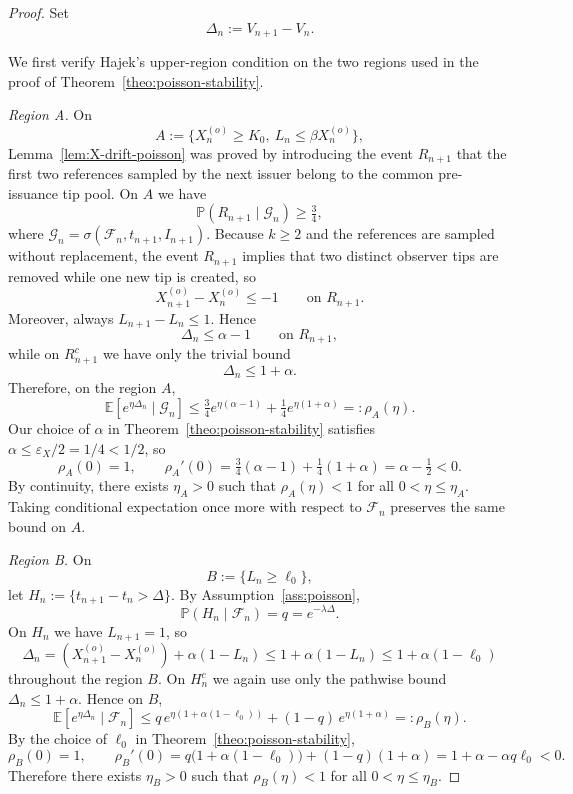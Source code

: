 \documentclass[a4paper,12pt,oneside,reqno]{amsart}
\renewcommand{\P}{{\mathbb P}}
\newcommand{\E}{{\mathbb E}}
\newcommand{\F}{{\mathcal F}}
\newcommand{\1}{{\mathbf 1}}
\begin{document}
\begin{proof}
Set
\[
   \Delta_n:=V_{n+1}-V_n.
\]

We first verify Hajek's upper-region condition on the two regions used in the proof of Theorem~\ref{theo:poisson-stability}.

\smallskip
\noindent\emph{Region A.} On
\[
   A:=\{X_n^{(o)}\ge K_0,\ L_n\le \beta X_n^{(o)}\},
\]
Lemma~\ref{lem:X-drift-poisson} was proved by introducing the event $R_{n+1}$ that the first two references sampled by the next issuer belong to the common pre-issuance tip pool. On $A$ we have
\[
   \P(R_{n+1}\mid \mathcal{G}_n)\ge \tfrac34,
\]
where $\mathcal{G}_n=\sigma(\F_n,t_{n+1},I_{n+1})$. Because $k\ge 2$ and the references are sampled without replacement, the event $R_{n+1}$ implies that two distinct observer tips are removed while one new tip is created, so
\[
   X_{n+1}^{(o)}-X_n^{(o)}\le -1
   \qquad\text{on }R_{n+1}.
\]
Moreover, always $L_{n+1}-L_n\le 1$. Hence
\[
   \Delta_n\le \alpha-1
   \qquad\text{on }R_{n+1},
\]
while on $R_{n+1}^{c}$ we have only the trivial bound
\[
   \Delta_n\le 1+\alpha.
\]
Therefore, on the region $A$,
\[
   \E[e^{\eta\Delta_n}\mid \mathcal{G}_n]
   \le \tfrac34 e^{\eta(\alpha-1)}+\tfrac14 e^{\eta(1+\alpha)}
   =:\rho_A(\eta).
\]
Our choice of $\alpha$ in Theorem~\ref{theo:poisson-stability} satisfies $\alpha\le \varepsilon_X/2=1/4<1/2$, so
\[
   \rho_A(0)=1,
   \qquad
   \rho_A'(0)=\tfrac34(\alpha-1)+\tfrac14(1+\alpha)=\alpha-\tfrac12<0.
\]
By continuity, there exists $\eta_A>0$ such that $\rho_A(\eta)<1$ for all $0<\eta\le \eta_A$. Taking conditional expectation once more with respect to $\F_n$ preserves the same bound on $A$.

\smallskip
\noindent\emph{Region B.} On
\[
   B:=\{L_n\ge \ell_0\},
\]
let $H_n:=\{t_{n+1}-t_n>\Delta\}$. By Assumption~\ref{ass:poisson},
\[
   \P(H_n\mid \F_n)=q=e^{-\lambda\Delta}.
\]
On $H_n$ we have $L_{n+1}=1$, so
\[
   \Delta_n
   =
   (X_{n+1}^{(o)}-X_n^{(o)})+\alpha(1-L_n)
   \le 1+\alpha(1-L_n)
   \le 1+\alpha(1-\ell_0)
\]
throughout the region $B$. On $H_n^c$ we again use only the pathwise bound $\Delta_n\le 1+\alpha$. Hence on $B$,
\[
   \E[e^{\eta\Delta_n}\mid \F_n]
   \le q\,e^{\eta(1+\alpha(1-\ell_0))} + (1-q)\,e^{\eta(1+\alpha)}
   =:\rho_B(\eta).
\]
By the choice of $\ell_0$ in Theorem~\ref{theo:poisson-stability},
\[
   \rho_B(0)=1,
   \qquad
   \rho_B'(0)=q\bigl(1+\alpha(1-\ell_0)\bigr)+(1-q)(1+\alpha)
   = 1+\alpha-\alpha q\ell_0<0.
\]
Therefore there exists $\eta_B>0$ such that $\rho_B(\eta)<1$ for all $0<\eta\le \eta_B$.


\end{proof}
\end{document}
